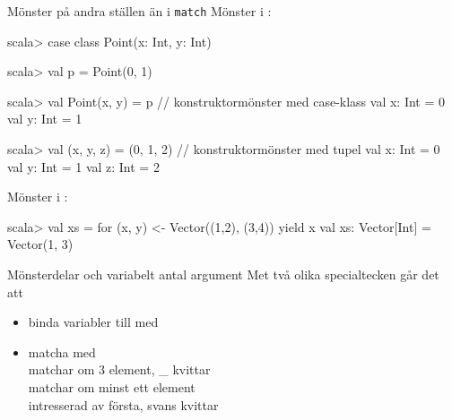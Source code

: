 \begin{Slide}{Mönster på andra ställen än i \texttt{match}}\SlideFontSmall
Mönster i :
\vspace{-0.25em}\begin{REPL}
scala> case class Point(x: Int, y: Int)

scala> val p = Point(0, 1)

scala> val Point(x, y) = p          // konstruktormönster med case-klass
val x: Int = 0
val y: Int = 1

scala> val (x, y, z) = (0, 1, 2)    // konstruktormönster med tupel
val x: Int = 0
val y: Int = 1
val z: Int = 2

\end{REPL}
Mönster i :
\vspace{-0.25em}\begin{REPL}
scala> val xs = for (x, y) <- Vector((1,2), (3,4)) yield x
val xs: Vector[Int] = Vector(1, 3)
\end{REPL}
\end{Slide}

\begin{Slide}{Mönsterdelar och variabelt antal argument}\SlideFontSmall
Met två olika specialtecken går det att
\begin{itemize}
\item binda variabler till  med  \\

\item matcha   med \code{*}  
\\   matchar om 3 element, \_ kvittar
\\   matchar om minst ett element
\\   intresserad av första, svans kvittar
\end{itemize}
\end{Slide}


